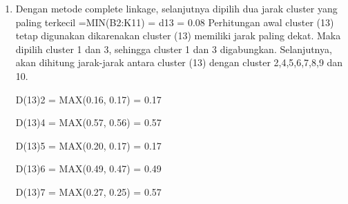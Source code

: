 \begin{enumerate}
\begin{table}[htbp]
\captionsetup{singlelinecheck=off}
\caption{Matrik Jarak, dengan Euclidian Distance}
\label{tab:my-table}
\end{table}

\item Dengan metode complete linkage, selanjutnya dipilih dua jarak cluster yang paling terkecil =MIN(B2:K11) = d13 = 0.08
Perhitungan awal cluster (13) tetap digunakan dikarenakan cluster (13) memiliki jarak paling dekat. Maka dipilih cluster 1 dan 3, sehingga cluster 1 dan 3 digabungkan. Selanjutnya, akan dihitung jarak-jarak antara cluster (13) dengan cluster 2,4,5,6,7,8,9 dan 10.

D(13)2 = MAX(0.16, 0.17) = 0.17

D(13)4 = MAX(0.57, 0.56) = 0.57

D(13)5 = MAX(0.20, 0.17) = 0.17

D(13)6 = MAX(0.49, 0.47) = 0.49

D(13)7 = MAX(0.27, 0.25) = 0.57


\end{enumerate}

